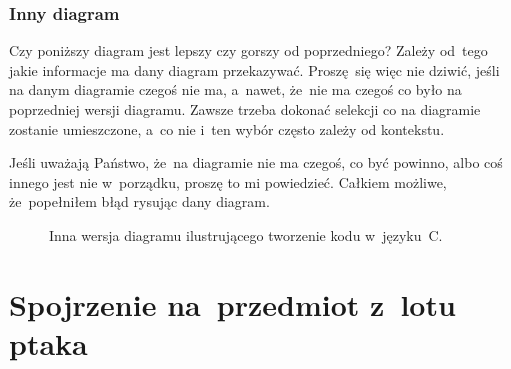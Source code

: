\documentclass[10pt,t]{beamer}
\begin{document}
\begin{frame}
  \frametitle{Inny diagram}


  Czy poniższy diagram jest lepszy czy gorszy od poprzedniego? Zależy
  od~tego jakie informacje ma dany diagram przekazywać. Proszę~się więc nie
  dziwić, jeśli na danym diagramie czegoś nie ma, a~nawet, że~nie ma czegoś
  co było na poprzedniej wersji diagramu. Zawsze trzeba dokonać selekcji co
  na diagramie zostanie umieszczone, a~co nie i~ten wybór często zależy
  od kontekstu.

  Jeśli uważają Państwo, że~na diagramie nie ma czegoś, co być powinno,
  albo coś innego jest nie w~porządku, \alert{proszę} to mi powiedzieć.
  Całkiem możliwe, że~popełniłem błąd rysując dany diagram.






  \begin{figure}


    \caption{Inna wersja diagramu ilustrującego tworzenie kodu w~języku~C.}


  \end{figure}

\end{frame}










\section{Spojrzenie na~przedmiot z~lotu ptaka}
\end{document}
